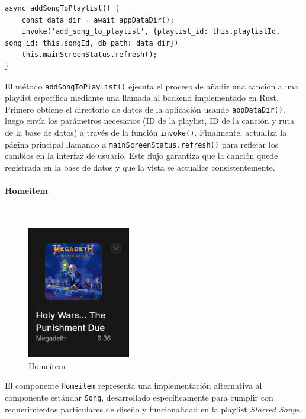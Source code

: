 \documentclass[11pt, a4paper]{article}
\begin{document}
                \begin{lstlisting}[caption={addSongToPlaylist()}]
async addSongToPlaylist() {
    const data_dir = await appDataDir();
    invoke('add_song_to_playlist', {playlist_id: this.playlistId, song_id: this.songId, db_path: data_dir})
    this.mainScreenStatus.refresh();
}
                \end{lstlisting}

                El método \texttt{addSongToPlaylist()} ejecuta el proceso de añadir una canción a una playlist específica mediante una llamada al backend implementado en Rust. Primero obtiene el directorio de datos de la aplicación usando \texttt{appDataDir()}, luego envía los parámetros necesarios (ID de la playlist, ID de la canción y ruta de la base de datos) a través de la función \texttt{invoke()}. Finalmente, actualiza la página principal llamando a \texttt{mainScreenStatus.refresh()} para reflejar los cambios en la interfaz de usuario. Este flujo garantiza que la canción quede registrada en la base de datos y que la vista se actualice consistentemente.

                \paragraph{Homeitem}
                ‎

                \begin{figure}[H]
                    \centering
                    \includegraphics[width=0.4\textwidth]{media/screenshots/homeitem.png}
                    \caption{Homeitem}
                    \label{fig:homeitem}
                \end{figure}

                El componente \texttt{Homeitem} representa una implementación alternativa al componente estándar \texttt{Song}, desarrollado específicamente para cumplir con requerimientos particulares de diseño y funcionalidad en la playlist \textit{Starred Songs}.
\end{document}
